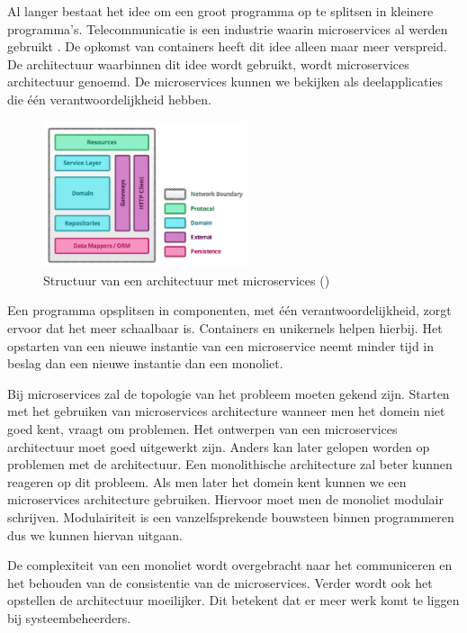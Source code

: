 \documentclass[pdftex,a4paper,12pt,twoside]{report}
\begin{document}
Al langer bestaat het idee om een groot programma op te splitsen in kleinere programma's. Telecommunicatie is een industrie waarin microservices al werden gebruikt \cite{griffin_survey_2007}. De opkomst van containers heeft dit idee alleen maar meer verspreid. De architectuur waarbinnen dit idee wordt gebruikt, wordt microservices architectuur genoemd. De microservices kunnen we bekijken als deelapplicaties die één verantwoordelijkheid hebben.

\begin{figure}
    \centering
    \includegraphics[width=6cm]{img/microservice_structure_example}
    \caption{Structuur van een architectuur met microservices (\cite{toby_clemson_testing_2014}) }
    \label{fig:microservice_structure_example}
\end{figure}


Een programma opsplitsen in componenten, met één verantwoordelijkheid, zorgt ervoor dat het meer schaalbaar is. Containers en unikernels helpen hierbij. Het opstarten van een nieuwe instantie van een microservice neemt minder tijd in beslag dan een nieuwe instantie dan een monoliet.

Bij microservices zal de topologie van het probleem moeten gekend zijn. Starten met het gebruiken van microservices architecture wanneer men het domein niet goed kent, vraagt om problemen. Het ontwerpen van een microservices architectuur moet goed uitgewerkt zijn. Anders kan later gelopen worden op problemen met de architectuur. Een monolithische architecture zal beter kunnen reageren op dit probleem. Als men later het domein kent kunnen we een microservices architecture gebruiken. Hiervoor moet men de monoliet modulair schrijven. Modulairiteit is een vanzelfsprekende bouwsteen binnen programmeren dus we kunnen hiervan uitgaan.

De complexiteit van een monoliet wordt overgebracht naar het communiceren en het behouden van de consistentie van de microservices. Verder wordt ook het opstellen de architectuur moeilijker. Dit betekent dat er meer werk komt te liggen bij systeembeheerders.
\end{document}
